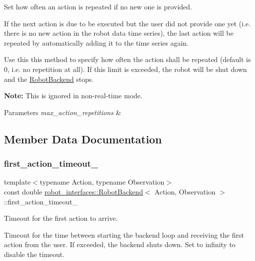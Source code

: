 Set how often an action is repeated if no new one is provided. 

If the next action is due to be executed but the user did not provide one yet (i.\+e. there is no new action in the robot data time series), the last action will be repeated by automatically adding it to the time series again.

Use this this method to specify how often the action shall be repeated (default is 0, i.\+e. no repetition at all). If this limit is exceeded, the robot will be shut down and the \hyperlink{classrobot__interfaces_1_1RobotBackend}{Robot\+Backend} stops.

{\bfseries Note\+:} This is ignored in non-\/real-\/time mode.


\begin{DoxyParams}{Parameters}
{\em max\+\_\+action\+\_\+repetitions} & \\
\hline
\end{DoxyParams}


\subsection{Member Data Documentation}
\mbox{\label{classrobot__interfaces_1_1RobotBackend_a56f111a9e0663eedefbaf55de36f7cac}} 
\subsubsection{\texorpdfstring{first\+\_\+action\+\_\+timeout\+\_\+}{first\_action\_timeout\_}}
{\footnotesize\ttfamily template$<$typename Action, typename Observation$>$ \\
const double \hyperlink{classrobot__interfaces_1_1RobotBackend}{robot\+\_\+interfaces\+::\+Robot\+Backend}$<$ Action, Observation $>$\+::first\+\_\+action\+\_\+timeout\+\_\+\hspace{0.3cm}{\ttfamily [private]}}



Timeout for the first action to arrive. 

Timeout for the time between starting the backend loop and receiving the first action from the user. If exceeded, the backend shuts down. Set to infinity to disable the timeout. \mbox{\label{classrobot__interfaces_1_1RobotBackend_abe24206dcf102b33f8ee472e287f485a}} 
